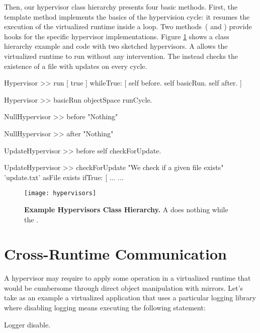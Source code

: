 Then, our hypervisor class hierarchy presents four basic methods. First, the  template method implements the basics of the hypervision cycle: it resumes the execution of the virtualized runtime inside a loop. Two methods~( and ) provide hooks for the specific hypervisor implementations. Figure \ref{fig:hypervisors} shows a class hierarchy example and code with two sketched hypervisors. A  allows the virtualized runtime to run without any intervention. The  instead checks the existence of a file with updates on every cycle.

\begin{code}
Hypervisor >> run
    [ true ] whileTrue: [
        self before.
        self basicRun.
        self after.
    ]

Hypervisor >> basicRun
    objectSpace runCycle.

NullHypervisor >> before
    "Nothing"

NullHypervisor >> after
    "Nothing"

UpdateHypervisor >> before
    self checkForUpdate.

UpdateHypervisor >> checkForUpdate
    "We check if a given file exists"
    'update.txt' asFile exists ifTrue: [ ...
    ...
\end{code}

\begin{figure}[ht]
\center
\texttt{[image: hypervisors]}
\caption{\textbf{Example Hypervisors Class Hierarchy.} A  does nothing while the .\label{fig:hypervisors}}
\end{figure}

\section{Cross-Runtime Communication} \label{sec:communication}\label{sec:isolation}

A hypervisor may require to apply some operation in a virtualized runtime that would be cumbersome through direct object manipulation with mirrors. Let's take as an example a virtualized application that uses a particular logging library where disabling logging means executing the following statement:

\begin{code}
Logger disable.
\end{code}


